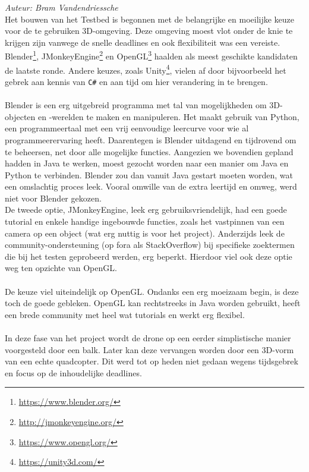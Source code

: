 {\em Auteur: Bram Vandendriessche}\\

\noindent
Het bouwen van het Testbed is begonnen met de belangrijke en moeilijke keuze voor de te gebruiken 3D-omgeving. Deze omgeving moest vlot onder de knie te krijgen zijn vanwege de snelle deadlines en ook flexibiliteit was een vereiste. Blender\footnote{\url{https://www.blender.org/}}, JMonkeyEngine\footnote{\url{http://jmonkeyengine.org/}} en OpenGL\footnote{\url{https://www.opengl.org/}} haalden als meest geschikte kandidaten de laatste ronde. Andere keuzes, zoals Unity\footnote{\url{https://unity3d.com/}}, vielen af door bijvoorbeeld het gebrek aan kennis van \texttt{C\#} en aan tijd om hier verandering in te brengen.\\
~\\
Blender is een erg uitgebreid programma met tal van mogelijkheden om 3D-objecten en -werelden te maken en manipuleren. Het maakt gebruik van Python, een programmeertaal met een vrij eenvoudige leercurve voor wie al programmeerervaring heeft. Daarentegen is Blender uitdagend en tijdrovend om te beheersen, net door alle mogelijke functies. Aangezien we bovendien gepland hadden in Java te werken, moest gezocht worden naar een manier om Java en Python te verbinden. Blender zou dan vanuit Java gestart moeten worden, wat een omslachtig proces leek. Vooral omwille van de extra leertijd en omweg, werd niet voor Blender gekozen. \\
De tweede optie, JMonkeyEngine, leek erg gebruiksvriendelijk, had een goede tutorial en enkele handige ingebouwde functies, zoals het vastpinnen van een camera op een object (wat erg nuttig is voor het project). Anderzijds leek de community-ondersteuning (op fora als StackOverflow) bij specifieke zoektermen die bij het testen geprobeerd werden, erg beperkt. Hierdoor viel ook deze optie weg ten opzichte van OpenGL.\\
\\
De keuze viel uiteindelijk op OpenGL. Ondanks een erg moeizaam begin, is deze toch de goede gebleken. OpenGL kan rechtstreeks in Java worden gebruikt, heeft een brede community met heel wat tutorials en werkt erg flexibel.
\\
\\
In deze fase van het project wordt de drone op een eerder simplistische manier voorgesteld door een balk. Later kan deze vervangen worden door een 3D-vorm van een echte quadcopter. Dit werd tot op heden niet gedaan wegens tijdsgebrek en focus op de inhoudelijke deadlines. 

